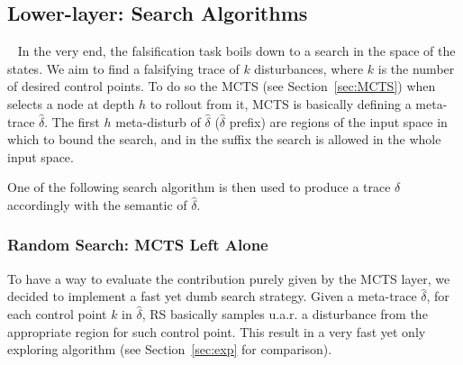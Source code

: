 \documentclass[11pt]{article}
\begin{document}

\subsection{Lower-layer: Search Algorithms}~\label{sec:srcalg}
In the very end, the falsification task boils down to a search in the space of the states. 
We aim to find a falsifying trace of $k$ disturbances, where $k$ is the number of desired control points. 
To do so the MCTS (see Section~\ref{sec:MCTS}) when selects a node at depth $h$ to rollout from it, MCTS is basically defining a meta-trace $\hat{\delta}$. The first $h$ meta-disturb of $\hat{\delta}$ ($\hat{\delta}$ prefix) are regions of the input space in which to bound the search, and in the suffix the search is allowed in the whole input space. 

One of the following search algorithm is then used to produce a trace $\delta$ accordingly with the semantic of $\hat{\delta}$.

\subsubsection{Random Search: MCTS Left Alone}
To have a way to evaluate the contribution purely given by the MCTS layer, we decided to implement a fast yet dumb search strategy.
Given a meta-trace $\hat{\delta}$, for each control point $k$ in $\hat{\delta}$, RS basically samples u.a.r. a disturbance from the appropriate region for such control point.
This result in a very fast yet only exploring algorithm (see Section~\ref{sec:exp} for comparison). 
\end{document}
